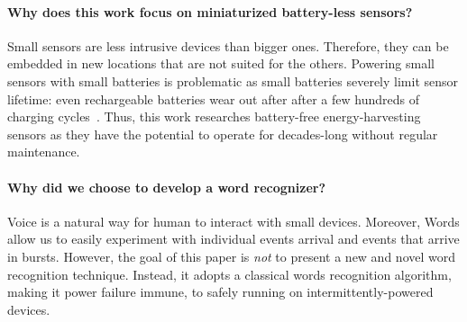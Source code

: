 \paragraph{Why does this work focus on miniaturized battery-less sensors?}
Small sensors are less intrusive devices than bigger ones. Therefore, they can be embedded in new locations that are not suited for the others. Powering small sensors with small batteries is problematic as small batteries severely limit sensor lifetime: even rechargeable batteries wear out after after a few hundreds of charging cycles~\cite{aditya2008comparison}.  Thus, this work researches battery-free energy-harvesting sensors as they have the potential to operate for decades-long without regular maintenance.

\paragraph{Why did we choose to develop a word recognizer?}
Voice is a natural way for human to interact with small devices. Moreover,
Words allow us to easily experiment with individual events arrival and events that arrive in bursts. However, the goal of this paper is \emph{not} to present a new and novel word recognition technique. Instead, it adopts a classical words recognition algorithm, making it power failure immune, to safely running on intermittently-powered devices. 






















